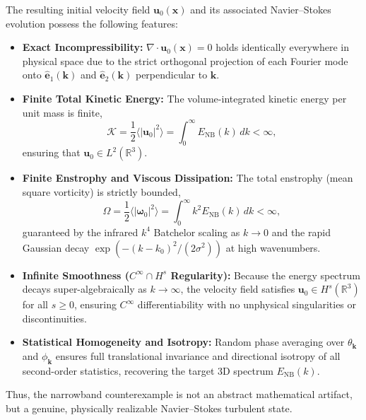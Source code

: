 \documentclass[lineno]{jfm}
\begin{document}
The resulting initial velocity field $\mathbf{u}_0(\mathbf{x})$ and its associated Navier--Stokes evolution possess the following features:
\begin{itemize}
\item \textbf{Exact Incompressibility:} $\nabla \cdot \mathbf{u}_0(\mathbf{x}) = 0$ holds identically everywhere in physical space due to the strict orthogonal projection of each Fourier mode onto $\hat{\mathbf{e}}_1(\mathbf{k})$ and $\hat{\mathbf{e}}_2(\mathbf{k})$ perpendicular to $\mathbf{k}$.
\item \textbf{Finite Total Kinetic Energy:} The volume-integrated kinetic energy per unit mass is finite,
\begin{equation}
\mathcal{K} = \frac{1}{2} \langle |\mathbf{u}_0|^2 \rangle = \int_0^\infty E_{\text{NB}}(k)\,dk < \infty,
\end{equation}
ensuring that $\mathbf{u}_0 \in L^2(\mathbb{R}^3)$.
\item \textbf{Finite Enstrophy and Viscous Dissipation:} The total enstrophy (mean square vorticity) is strictly bounded,
\begin{equation}
\Omega = \frac{1}{2} \langle |\boldsymbol{\omega}_0|^2 \rangle = \int_0^\infty k^2 E_{\text{NB}}(k)\,dk < \infty,
\end{equation}
guaranteed by the infrared $k^4$ Batchelor scaling as $k \to 0$ and the rapid Gaussian decay $\exp(-(k-k_0)^2/(2\sigma^2))$ at high wavenumbers.
\item \textbf{Infinite Smoothness ($C^\infty \cap H^s$ Regularity):} Because the energy spectrum decays super-algebraically as $k \to \infty$, the velocity field satisfies $\mathbf{u}_0 \in H^s(\mathbb{R}^3)$ for all $s \ge 0$, ensuring $C^\infty$ differentiability with no unphysical singularities or discontinuities.
\item \textbf{Statistical Homogeneity and Isotropy:} Random phase averaging over $\theta_{\mathbf{k}}$ and $\phi_{\mathbf{k}}$ ensures full translational invariance and directional isotropy of all second-order statistics, recovering the target 3D spectrum $E_{\text{NB}}(k)$.
\end{itemize}
Thus, the narrowband counterexample is not an abstract mathematical artifact, but a genuine, physically realizable Navier--Stokes turbulent state.
\end{document}
